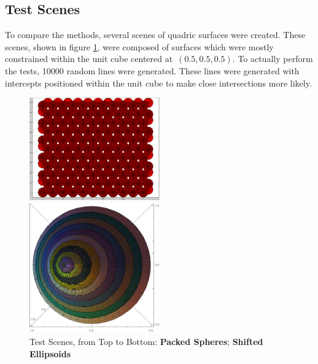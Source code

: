 \documentclass{cccg16}
\begin{document}
\subsection{Test Scenes}
To compare the methods, several scenes of quadric surfaces were
created.  These scenes, shown in figure \ref{fig:testScenes}, were
composed of surfaces which were mostly constrained within the unit
cube centered at~$(0.5, 0.5, 0.5)$.  To actually perform the tests,
10000 random lines were generated.  These lines were generated with
intercepts positioned within the unit cube to make close intersections
more likely.

\begin{figure}
  \includegraphics[width=0.5\textwidth]{imgs/packedSpheres.png}
  
  \vspace{5mm}
  \includegraphics[width=0.5\textwidth]{imgs/hardEllipsoidsSingle.png}
  \caption{Test Scenes, from Top to Bottom:
    {\bf Packed Spheres};
    {\bf Shifted Ellipsoids}}
  \label{fig:testScenes}
\end{figure}
\end{document}

